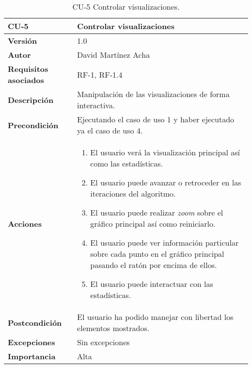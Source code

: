 \begin{table}[p]
	\centering
	\begin{tabularx}{\linewidth}{ p{} p{} }
		\toprule
		\textbf{CU-5}    & \textbf{Controlar visualizaciones}\\
		\toprule
		\textbf{Versión}              & 1.0    \\
		\textbf{Autor}                & David Martínez Acha \\
		\textbf{Requisitos asociados} & RF-1, RF-1.4 \\
		\textbf{Descripción}          & Manipulación de las visualizaciones de forma interactiva. \\
		\textbf{Precondición}         & Ejecutando el caso de uso 1 y haber ejecutado ya el caso de uso 4. \\
		\textbf{Acciones}             &
		\begin{enumerate}
			\def\labelenumi{\arabic{enumi}.}
			\tightlist
			\item El usuario verá la visualización principal así como las estadísticas.
			\item El usuario puede avanzar o retroceder en las iteraciones del algoritmo.
			\item El usuario puede realizar \textit{zoom} sobre el gráfico principal así como reiniciarlo.
			\item El usuario puede ver información particular sobre cada punto en el gráfico principal pasando el ratón por encima de ellos.
			\item El usuario puede interactuar con las estadísticas.
		\end{enumerate}\\
		\textbf{Postcondición}        & El usuario ha podido manejar con libertad los elementos mostrados. \\
		\textbf{Excepciones}          & Sin excepciones \\
		\textbf{Importancia}          & Alta \\
		\bottomrule
	\end{tabularx}
	\caption{CU-5 Controlar visualizaciones.}
\end{table}

